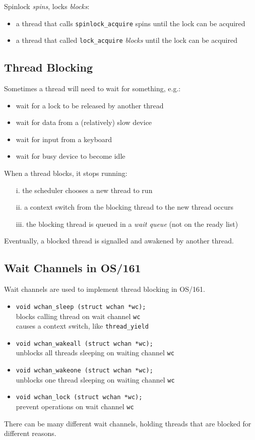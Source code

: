 \documentclass[12pt]{article}
\theoremstyle{plain}
\theoremstyle{definition}
\begin{document}
Spinlock \emph{spins}, locks \emph{blocks}:
\begin{itemize}
  \item a thread that calls \texttt{spinlock\_acquire} spins until the lock can be acquired
  \item a thread that called \texttt{lock\_acquire} \emph{blocks} until the lock can be acquired
\end{itemize}

\subsection{Thread Blocking}
Sometimes a thread will need to wait for something, e.g.:
\begin{itemize}
  \item wait for a lock to be released by another thread
  \item wait for data from a (relatively) slow device
  \item wait for input from a keyboard
  \item wait for busy device to become idle
\end{itemize}

When a thread blocks, it stops running:
\begin{enumerate}
  \item[i.] the scheduler chooses a new thread to run
  \item[ii.] a context switch from the blocking thread to the new thread occurs
  \item[iii.] the blocking thread is queued in a \emph{wait queue} (not on the ready list)
\end{enumerate}

Eventually, a blocked thread is signalled and awakened by another thread.

\subsection{Wait Channels in OS/161}
Wait channels are used to implement thread blocking in OS/161.
\begin{itemize}
  \item \texttt{void wchan\_sleep (struct wchan *wc);} \\
  blocks calling thread on wait channel \texttt{wc} \\
  causes a context switch, like \texttt{thread\_yield}
  \item \texttt{void wchan\_wakeall (struct wchan *wc);} \\
  unblocks all threads sleeping on waiting channel \texttt{wc}
  \item \texttt{void wchan\_wakeone (struct wchan *wc);} \\
  unblocks one thread sleeping on waiting channel \texttt{wc}
  \item \texttt{void wchan\_lock (struct wchan *wc);} \\
  prevent operations on wait channel \texttt{wc}
\end{itemize}
There can be many different wait channels, holding threads that are blocked for different reasons.
\end{document}
